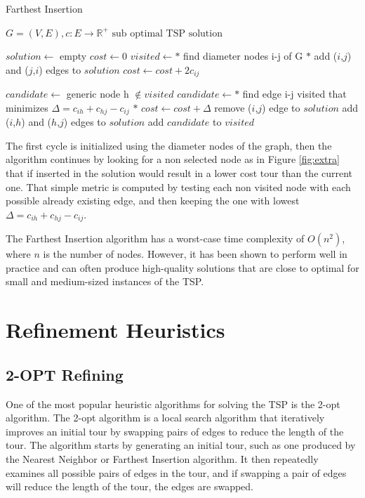 \begin{algorithm}[!h]
    \caption{Farthest Insertion}\label{algo:extramileage}
    \begin{algorithmic}[1]
    \Require $G = (V,E), c:E \to \mathbb{R}^+$
    \Ensure $\text{sub optimal TSP solution}$


    \State $solution \gets$ empty
    \State $cost \gets 0$
    \State $visited \gets  *$ find diameter nodes i-j of G $*$
    \State add ($i$,$j$) and ($j$,$i$) edges to $solution$
    \State $cost \gets cost + 2 c_{ij}$
   




    \State $candidate \gets $ generic node h $ \notin visited$
    \State $candidate \gets *$ find edge i-j visited that minimizes $\Delta = c_{ih} + c_{hj} - c_{ij}$ $*$
    \State $cost \gets cost + \Delta$
    \State remove ($i$,$j$) edge to $solution$
    \State add ($i$,$h$) and ($h$,$j$) edges to $solution$
    \State add $candidate$ to $visited$


    \EndWhile






    \end{algorithmic}
\end{algorithm}

The first cycle is initialized using the diameter nodes of the graph, then the algorithm continues by looking for a non selected node as in Figure \ref{fig:extra} that if inserted in the solution would result in a lower cost tour than the current one.
That simple metric is computed by testing each non visited node with each possible already existing edge, and then keeping the one with lowest $\Delta = c_{ih} + c_{hj} - c_{ij}$.

The Farthest Insertion algorithm has a worst-case time complexity of $O(n^2)$, where $n$ is the number of nodes. However, it has been shown to perform well in practice and can often produce high-quality solutions that are close to optimal for small and medium-sized instances of the TSP.



\section{Refinement Heuristics}
\subsection{2-OPT Refining}\label{2OPT}
One of the most popular heuristic algorithms for solving the TSP is the 2-opt algorithm.
The 2-opt algorithm is a local search algorithm that iteratively improves an initial tour by swapping pairs of edges to reduce the length of the tour. The algorithm starts by generating an initial tour, such as one produced by the Nearest Neighbor or Farthest Insertion algorithm. It then repeatedly examines all possible pairs of edges in the tour, and if swapping a pair of edges will reduce the length of the tour, the edges are swapped.

